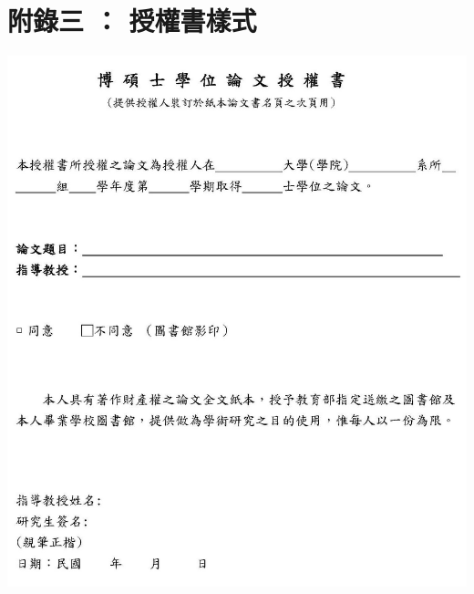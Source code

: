 \documentclass[12pt,oneside,openany,a4paper]{book}
\begin{document}
\chapter{附錄三 ： 授權書樣式}
    \begin{center}
        \includegraphics[bb=0 0 1341 1548,width=\textwidth]{authority.jpg}
    \end{center}
\end{document}
